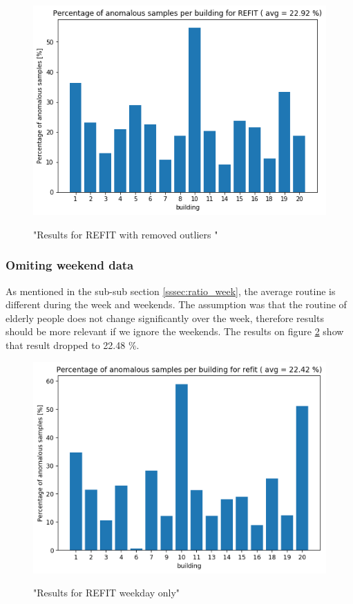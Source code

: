 \begin{figure}[H]
	\centering
	\caption{"Results for REFIT with removed outliers "}
	\includegraphics[width=.8\textwidth]{Figures/EC/refit_res2.png}
	\label{fig:refit_res2}
\end{figure}

\subsubsection{Omiting weekend data}

As mentioned in the sub-sub section \ref{sssec:ratio_week}, the average routine is different during the week and weekends.
The assumption was that the routine of elderly people does not change significantly over the week, therefore results should be more relevant if we ignore the weekends.
The results on figure \ref{fig:refit_res_nw_1"} show that result dropped to 22.48 \%.

\begin{figure}[H]
	\centering
	\caption{"Results for REFIT weekday only"}
	\includegraphics[width=.8\textwidth]{Figures/EC/refit_res_nw_1.png}
	\label{fig:refit_res_nw_1"}
\end{figure}

